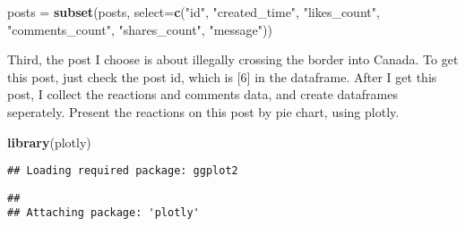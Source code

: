 \documentclass[]{article}
\newenvironment{Shaded}{\begin{snugshade}}{\end{snugshade}}
\newcommand{\KeywordTok}[1]{\textcolor[rgb]{0.13,0.29,0.53}{\textbf{{#1}}}}
\newcommand{\DataTypeTok}[1]{\textcolor[rgb]{0.13,0.29,0.53}{{#1}}}
\newcommand{\DecValTok}[1]{\textcolor[rgb]{0.00,0.00,0.81}{{#1}}}
\newcommand{\StringTok}[1]{\textcolor[rgb]{0.31,0.60,0.02}{{#1}}}
\newcommand{\NormalTok}[1]{{#1}}
\begin{document}
\begin{Shaded}
\begin{Highlighting}[]
\NormalTok{posts =}\StringTok{ }\KeywordTok{subset}\NormalTok{(posts, }\DataTypeTok{select=}\KeywordTok{c}\NormalTok{(}\StringTok{"id"}\NormalTok{, }\StringTok{"created_time"}\NormalTok{, }\StringTok{"likes_count"}\NormalTok{, }\StringTok{"comments_count"}\NormalTok{, }\StringTok{"shares_count"}\NormalTok{, }\StringTok{"message"}\NormalTok{))}
\end{Highlighting}
\end{Shaded}

Third, the post I choose is about illegally crossing the border into
Canada. To get this post, just check the post id, which is {[}6{]} in
the dataframe. After I get this post, I collect the reactions and
comments data, and create dataframes seperately. Present the reactions
on this post by pie chart, using plotly.

\begin{Shaded}
\end{Shaded}

\begin{Shaded}
\begin{Highlighting}[]
\KeywordTok{library}\NormalTok{(plotly)}
\end{Highlighting}
\end{Shaded}

\begin{verbatim}
## Loading required package: ggplot2
\end{verbatim}

\begin{verbatim}
## 
## Attaching package: 'plotly'
\end{verbatim}
\end{document}
